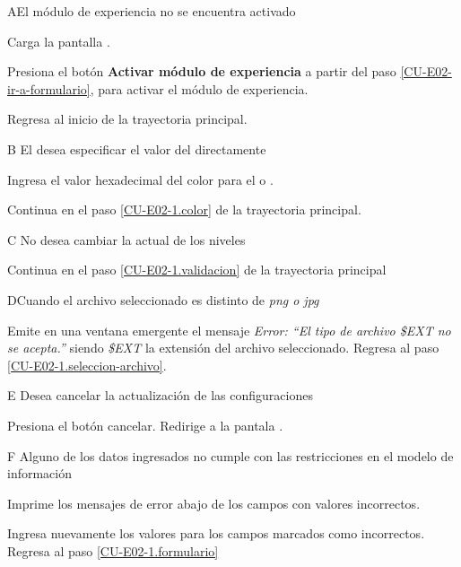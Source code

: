 \begin{UCtrayectoriaA}{A}{El módulo de experiencia no se encuentra activado}

  \Sistema Carga la pantalla .

  \Actor Presiona el botón {\bf Activar módulo de experiencia}
   a partir del paso \ref{CU-E02-ir-a-formulario},
                     para activar el módulo de experiencia.

  \Sistema Regresa al inicio de la trayectoria principal.
           
\end{UCtrayectoriaA}

\begin{UCtrayectoriaA}{B}{%
El  desea especificar el valor del 
directamente}

    \Actor Ingresa el valor hexadecimal del color para el 
            o 
           .

    \Sistema Continua en el paso \ref{CU-E02-1.color} de la trayectoria principal.

\end{UCtrayectoriaA}

\begin{UCtrayectoriaA}{C}{%
No desea cambiar la  actual de los niveles}

    \Sistema Continua en el paso \ref{CU-E02-1.validacion} de la trayectoria principal
\end{UCtrayectoriaA}

\begin{UCtrayectoriaA}{D}{Cuando el archivo seleccionado es distinto de {\it png o jpg}}

  \Sistema Emite en una ventana emergente el mensaje {\it Error: ``El tipo de
           archivo \$EXT no se acepta.''} siendo {\it\$EXT} la extensión del
           archivo seleccionado.
  \Sistema Regresa al paso \ref{CU-E02-1.seleccion-archivo}.

\end{UCtrayectoriaA}

\begin{UCtrayectoriaA}{E}{%
Desea cancelar la actualización de las configuraciones}

  \Actor Presiona el botón cancelar.
  \Sistema Redirige a la pantala .

\end{UCtrayectoriaA}

\begin{UCtrayectoriaA}{F}{%
Alguno de los datos ingresados no cumple con las restricciones en el modelo de
información}

    \Sistema Imprime los mensajes de error abajo de los campos con valores incorrectos.

    \Actor Ingresa nuevamente los valores para los campos marcados como incorrectos.
    \Sistema Regresa al paso \ref{CU-E02-1.formulario}

\end{UCtrayectoriaA}

